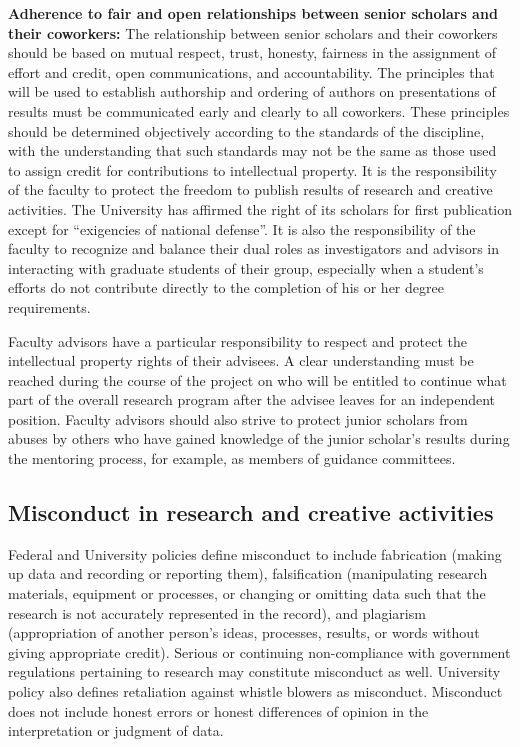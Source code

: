 \textbf{Adherence to fair and open relationships between senior
  scholars and their coworkers:} The relationship between senior
scholars and their coworkers should be based on mutual respect, trust,
honesty, fairness in the assignment of effort and credit, open
communications, and accountability. The principles that will be used
to establish authorship and ordering of authors on presentations of
results must be communicated early and clearly to all coworkers. These
principles should be determined objectively according to the standards
of the discipline, with the understanding that such standards may not
be the same as those used to assign credit for contributions to
intellectual property. It is the responsibility of the faculty to
protect the freedom to publish results of research and creative
activities. The University has affirmed the right of its scholars for
first publication except for “exigencies of national defense”. It is
also the responsibility of the faculty to recognize and balance their
dual roles as investigators and advisors in interacting with graduate
students of their group, especially when a student's efforts do not
contribute directly to the completion of his or her degree
requirements. 

Faculty advisors have a particular responsibility to respect and
protect the intellectual property rights of their advisees. A clear
understanding must be reached during the course of the project on who
will be entitled to continue what part of the overall research program
after the advisee leaves for an independent position. Faculty advisors
should also strive to protect junior scholars from abuses by others
who have gained knowledge of the junior scholar's results during the
mentoring process, for example, as members of guidance committees. 

\subsection{Misconduct in research and creative activities}

Federal and University policies define misconduct to include
fabrication (making up data and recording or reporting them),
falsification (manipulating research materials, equipment or
processes, or changing or omitting data such that the research is not
accurately represented in the record), and plagiarism (appropriation
of another person's ideas, processes, results, or words without giving
appropriate credit). Serious or continuing non-compliance with
government regulations pertaining to research may constitute
misconduct as well. University policy also defines retaliation against
whistle blowers as misconduct. Misconduct does not include honest
errors or honest differences of opinion in the interpretation or
judgment of data. 

